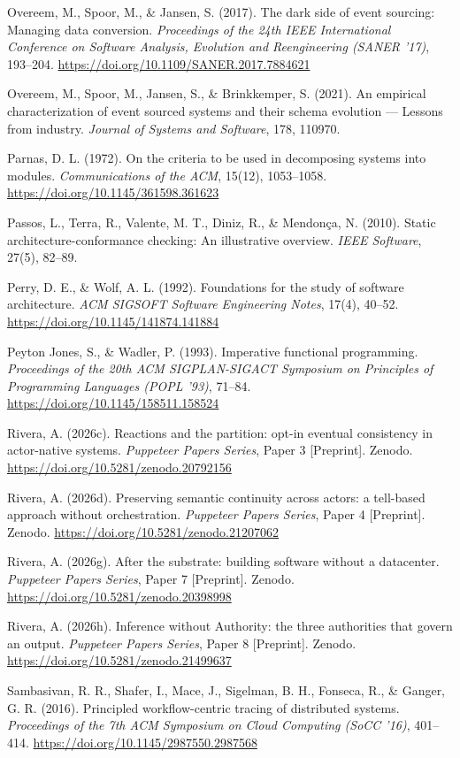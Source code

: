 \documentclass[
]{article}
\begin{document}
Overeem, M., Spoor, M., \& Jansen, S. (2017). The dark side of event
sourcing: Managing data conversion. \emph{Proceedings of the 24th IEEE
International Conference on Software Analysis, Evolution and
Reengineering (SANER '17)}, 193--204.
\url{https://doi.org/10.1109/SANER.2017.7884621}

Overeem, M., Spoor, M., Jansen, S., \& Brinkkemper, S. (2021). An
empirical characterization of event sourced systems and their schema
evolution --- Lessons from industry. \emph{Journal of Systems and
Software}, 178, 110970.

Parnas, D. L. (1972). On the criteria to be used in decomposing systems
into modules. \emph{Communications of the ACM}, 15(12), 1053--1058.
\url{https://doi.org/10.1145/361598.361623}

Passos, L., Terra, R., Valente, M. T., Diniz, R., \& Mendonça, N.
(2010). Static architecture-conformance checking: An illustrative
overview. \emph{IEEE Software}, 27(5), 82--89.

Perry, D. E., \& Wolf, A. L. (1992). Foundations for the study of
software architecture. \emph{ACM SIGSOFT Software Engineering Notes},
17(4), 40--52. \url{https://doi.org/10.1145/141874.141884}

Peyton Jones, S., \& Wadler, P. (1993). Imperative functional
programming. \emph{Proceedings of the 20th ACM SIGPLAN-SIGACT Symposium
on Principles of Programming Languages (POPL '93)}, 71--84.
\url{https://doi.org/10.1145/158511.158524}

Rivera, A. (2026c). Reactions and the partition: opt-in eventual
consistency in actor-native systems. \emph{Puppeteer Papers Series},
Paper 3 {[}Preprint{]}. Zenodo.
\url{https://doi.org/10.5281/zenodo.20792156}

Rivera, A. (2026d). Preserving semantic continuity across actors: a
tell-based approach without orchestration. \emph{Puppeteer Papers
Series}, Paper 4 {[}Preprint{]}. Zenodo.
\url{https://doi.org/10.5281/zenodo.21207062}

Rivera, A. (2026g). After the substrate: building software without a
datacenter. \emph{Puppeteer Papers Series}, Paper 7 {[}Preprint{]}.
Zenodo. \url{https://doi.org/10.5281/zenodo.20398998}

Rivera, A. (2026h). Inference without Authority: the three authorities
that govern an output. \emph{Puppeteer Papers Series}, Paper 8
{[}Preprint{]}. Zenodo. \url{https://doi.org/10.5281/zenodo.21499637}

Sambasivan, R. R., Shafer, I., Mace, J., Sigelman, B. H., Fonseca, R.,
\& Ganger, G. R. (2016). Principled workflow-centric tracing of
distributed systems. \emph{Proceedings of the 7th ACM Symposium on Cloud
Computing (SoCC '16)}, 401--414.
\url{https://doi.org/10.1145/2987550.2987568}
\end{document}
